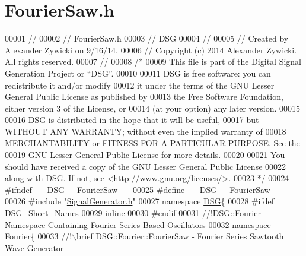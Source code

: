 \hypertarget{_fourier_saw_8h_source}{\section{Fourier\+Saw.\+h}
\label{_fourier_saw_8h_source}
}

\begin{DoxyCode}
00001 \textcolor{comment}{//}
00002 \textcolor{comment}{//  FourierSaw.h}
00003 \textcolor{comment}{//  DSG}
00004 \textcolor{comment}{//}
00005 \textcolor{comment}{//  Created by Alexander Zywicki on 9/16/14.}
00006 \textcolor{comment}{//  Copyright (c) 2014 Alexander Zywicki. All rights reserved.}
00007 \textcolor{comment}{//}
00008 \textcolor{comment}{/*}
00009 \textcolor{comment}{ This file is part of the Digital Signal Generation Project or “DSG”.}
00010 \textcolor{comment}{}
00011 \textcolor{comment}{ DSG is free software: you can redistribute it and/or modify}
00012 \textcolor{comment}{ it under the terms of the GNU Lesser General Public License as published by}
00013 \textcolor{comment}{ the Free Software Foundation, either version 3 of the License, or}
00014 \textcolor{comment}{ (at your option) any later version.}
00015 \textcolor{comment}{}
00016 \textcolor{comment}{ DSG is distributed in the hope that it will be useful,}
00017 \textcolor{comment}{ but WITHOUT ANY WARRANTY; without even the implied warranty of}
00018 \textcolor{comment}{ MERCHANTABILITY or FITNESS FOR A PARTICULAR PURPOSE.  See the}
00019 \textcolor{comment}{ GNU Lesser General Public License for more details.}
00020 \textcolor{comment}{}
00021 \textcolor{comment}{ You should have received a copy of the GNU Lesser General Public License}
00022 \textcolor{comment}{ along with DSG.  If not, see <http://www.gnu.org/licenses/>.}
00023 \textcolor{comment}{ */}
00024 \textcolor{preprocessor}{#ifndef \_\_DSG\_\_FourierSaw\_\_}
00025 \textcolor{preprocessor}{#define \_\_DSG\_\_FourierSaw\_\_}
00026 \textcolor{preprocessor}{#include "\hyperlink{_signal_generator_8h}{SignalGenerator.h}"}
00027 \textcolor{keyword}{namespace }\hyperlink{namespace_d_s_g}{DSG}\{
00028 \textcolor{preprocessor}{#ifdef DSG\_Short\_Names}
00029     \textcolor{keyword}{inline}
00030 \textcolor{preprocessor}{#endif}
00031 \textcolor{comment}{    //!DSG::Fourier - Namespace Containing Fourier Series Based Oscillators}
\hypertarget{_fourier_saw_8h_source_l00032}{}\hyperlink{namespace_d_s_g_1_1_fourier}{00032} \textcolor{comment}{}    \textcolor{keyword}{namespace }Fourier\{\textcolor{comment}{}
00033 \textcolor{comment}{        //!\(\backslash\)brief DSG::Fourier::FourierSaw - Fourier Series Sawtooth Wave Generator}

\end{DoxyCode}
